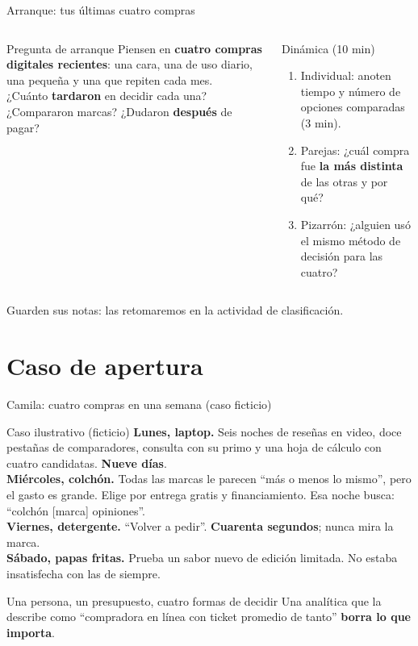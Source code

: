 \documentclass[aspectratio=169,xcolor=dvipsnames]{beamer}
\begin{document}
\begin{frame}{Arranque: tus últimas cuatro compras}
\begin{columns}[T]
  \begin{exampleblock}{Pregunta de arranque}
    Piensen en \textbf{cuatro compras digitales recientes}: una cara, una de uso diario, una pequeña y una que repiten cada mes.\\[4pt]
    ¿Cuánto \textbf{tardaron} en decidir cada una? ¿Compararon marcas? ¿Dudaron \textbf{después} de pagar?
  \end{exampleblock}
  \begin{block}{Dinámica (10 min)}
    \small
    \begin{enumerate}
      \item Individual: anoten tiempo y número de opciones comparadas (3 min).
      \item Parejas: ¿cuál compra fue \textbf{la más distinta} de las otras y por qué?
      \item Pizarrón: ¿alguien usó el mismo método de decisión para las cuatro?
    \end{enumerate}
  \end{block}
\end{columns}
\vspace{2pt}
{\small\color{IPNgris} Guarden sus notas: las retomaremos en la actividad de clasificación.}
\end{frame}

\section[Apertura]{Caso de apertura}

\begin{frame}{Camila: cuatro compras en una semana (caso ficticio)}
\begin{exampleblock}{Caso ilustrativo (ficticio)}
  \footnotesize
  \textbf{Lunes, laptop.} Seis noches de reseñas en video, doce pestañas de comparadores, consulta con su primo y una hoja de cálculo con cuatro candidatas. \textbf{Nueve días}.\\[2pt]
  \textbf{Miércoles, colchón.} Todas las marcas le parecen \enquote{más o menos lo mismo}, pero el gasto es grande. Elige por entrega gratis y financiamiento. Esa noche busca: \enquote{colchón [marca] opiniones}.\\[2pt]
  \textbf{Viernes, detergente.} \enquote{Volver a pedir}. \textbf{Cuarenta segundos}; nunca mira la marca.\\[2pt]
  \textbf{Sábado, papas fritas.} Prueba un sabor nuevo de edición limitada. No estaba insatisfecha con las de siempre.
\end{exampleblock}
\begin{alertblock}{Una persona, un presupuesto, cuatro formas de decidir}
  \small Una analítica que la describe como \enquote{compradora en línea con ticket promedio de tanto} \textbf{borra lo que importa}.
\end{alertblock}
\end{frame}
\end{document}
